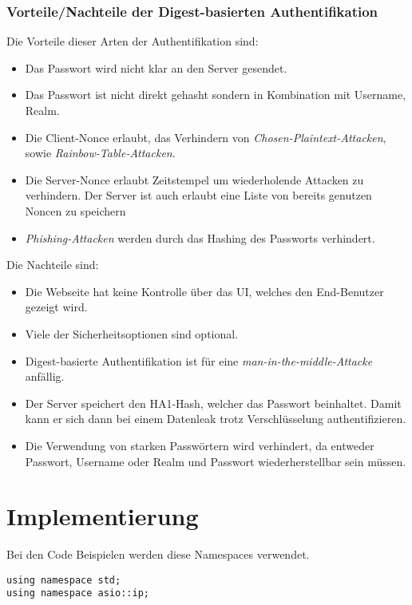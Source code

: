 \documentclass[12pt]{report}
\begin{document}
\subsection{Vorteile/Nachteile der Digest-basierten Authentifikation}
Die Vorteile dieser Arten der Authentifikation sind:
\begin{itemize}
    \item Das Passwort wird nicht klar an den Server gesendet. 
    \item Das Passwort ist nicht direkt gehasht sondern in Kombination mit Username, Realm. 
    \item Die Client-Nonce erlaubt, das Verhindern von \textit{Chosen-Plaintext-Attacken}, sowie \textit{Rainbow-Table-Attacken}. 
    \item Die Server-Nonce erlaubt Zeitstempel um wiederholende Attacken zu verhindern. Der Server ist auch erlaubt eine Liste von bereits genutzen Noncen zu speichern 
    \item \textit{Phishing-Attacken} werden durch das Hashing des Passworts verhindert. 
\end{itemize}
Die Nachteile sind:
\begin{itemize}
    \item Die Webseite hat keine Kontrolle über das UI, welches den End-Benutzer gezeigt wird.
    \item Viele der Sicherheitsoptionen sind optional.
    \item Digest-basierte Authentifikation ist für eine \textit{man-in-the-middle-Attacke} anfällig. 
    \item Der Server speichert den HA1-Hash, welcher das Passwort beinhaltet. Damit kann er sich dann bei einem Datenleak trotz Verschlüsselung authentifizieren. 
    \item Die Verwendung von starken Passwörtern wird verhindert, da entweder Passwort, Username oder Realm und Passwort wiederherstellbar sein müssen. 
\end{itemize}

\chapter{Implementierung}
Bei den Code Beispielen werden diese Namespaces verwendet.
\begin{verbatim}
using namespace std;
using namespace asio::ip;
\end{verbatim}
\end{document}
